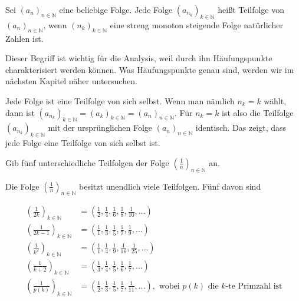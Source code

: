 \documentclass[fontsize=9pt,
               parskip=half-,
               DIV=14,
               listof=chapterentry,
               tocflat]{scrbook}
\begin{document}
\begin{definition*}[Teilfolge]
Sei $\left(a_{n}\right)_{n\in \mathbb {N} }$ eine beliebige Folge. Jede Folge $\left(a_{n_{k}}\right)_{k\in \mathbb {N} }$ heißt Teilfolge von $\left(a_{n}\right)_{n\in \mathbb {N} }$, wenn $\left(n_{k}\right)_{k\in \mathbb {N} }$ eine streng monoton steigende Folge natürlicher Zahlen ist.

\end{definition*}

Dieser Begriff ist wichtig für die Analysis, weil durch ihn Häufungspunkte charakterisiert werden können. Was Häufungspunkte genau sind, werden wir im nächsten Kapitel näher untersuchen.

\begin{hint*}
Jede Folge ist eine Teilfolge von sich selbst. Wenn man nämlich $n_{k}=k$ wählt, dann ist $\left(a_{n_{k}}\right)_{k\in \mathbb {N} }=\left(a_{k}\right)_{k\in \mathbb {N} }=\left(a_{n}\right)_{n\in \mathbb {N} }$. Für $n_{k}=k$ ist also die Teilfolge $\left(a_{n_{k}}\right)_{k\in \mathbb {N} }$ mit der ursprünglichen Folge $\left(a_{n}\right)_{n\in \mathbb {N} }$ identisch. Das zeigt, dass jede Folge eine Teilfolge von sich selbst ist.

\end{hint*}

\begin{exercise*}[Teilfolgen]
Gib fünf unterschiedliche Teilfolgen der Folge $\left({\tfrac {1}{n}}\right)_{n\in \mathbb {N} }$ an.

\end{exercise*}

\begin{solution*}[Teilfolgen]
Die Folge $\left({\tfrac {1}{n}}\right)_{n\in \mathbb {N} }$ besitzt unendlich viele Teilfolgen. Fünf davon sind

\begin{align*}
\left({\tfrac {1}{2k}}\right)_{k\in \mathbb {N} }&=\left({\tfrac {1}{2}},{\tfrac {1}{4}},{\tfrac {1}{6}},{\tfrac {1}{8}},{\tfrac {1}{10}},\ldots \right)\\\left({\tfrac {1}{2k-1}}\right)_{k\in \mathbb {N} }&=\left({\tfrac {1}{1}},{\tfrac {1}{3}},{\tfrac {1}{5}},{\tfrac {1}{7}},{\tfrac {1}{9}},\ldots \right)\\\left({\tfrac {1}{k^{2}}}\right)_{k\in \mathbb {N} }&=\left({\tfrac {1}{1}},{\tfrac {1}{4}},{\tfrac {1}{9}},{\tfrac {1}{16}},{\tfrac {1}{25}},\ldots \right)\\\left({\tfrac {1}{k+2}}\right)_{k\in \mathbb {N} }&=\left({\tfrac {1}{3}},{\tfrac {1}{4}},{\tfrac {1}{5}},{\tfrac {1}{6}},{\tfrac {1}{7}},\ldots \right)\\\left({\tfrac {1}{p(k)}}\right)_{k\in \mathbb {N} }&=\left({\tfrac {1}{2}},{\tfrac {1}{3}},{\tfrac {1}{5}},{\tfrac {1}{7}},{\tfrac {1}{11}},\ldots \right),{\text{ wobei }}p(k){\text{ die }}k{\text{-te Primzahl ist}}
\end{align*}

\end{solution*}
\end{document}
